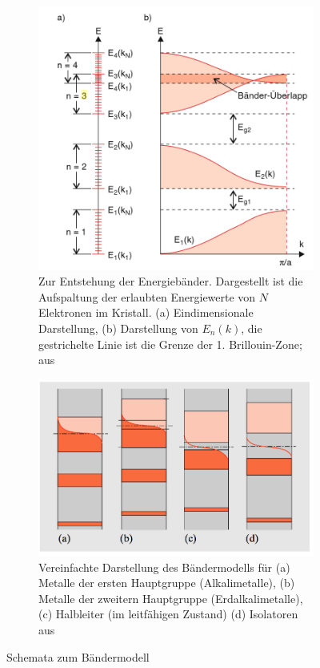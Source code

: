 \begin{figure}
    \centering
    \begin{subfigure}[b]{\picwidththeo}
        \includegraphics[width=\textwidth]{pics/baender1}
        \caption{Zur Entstehung der Energiebänder. Dargestellt ist die Aufspaltung der erlaubten 
Energiewerte von $N$ Elektronen im Kristall. 
(a) Eindimensionale Darstellung, 
(b) Darstellung von $E_n(k)$, die gestrichelte Linie ist die Grenze der 1. Brillouin-Zone;
aus \cite{demtroder2000experimentalphysik}}
        \label{fig:baender1}
    \end{subfigure}\qquad
    \begin{subfigure}[b]{\picwidththeo}
        \includegraphics[width=\textwidth]{pics/baender2}
        \caption{Vereinfachte Darstellung des Bändermodells für 
(a) Metalle der ersten Hauptgruppe (Alkalimetalle), 
(b) Metalle der zweitern Hauptgruppe (Erdalkalimetalle), 
(c) Halbleiter (im leitfähigen Zustand)
(d) Isolatoren
aus \cite{vogel1997gerthsen}}
        \label{fig:baender2}
    \end{subfigure}
    \caption{Schemata zum Bändermodell}\label{fig:baender}
\end{figure}
